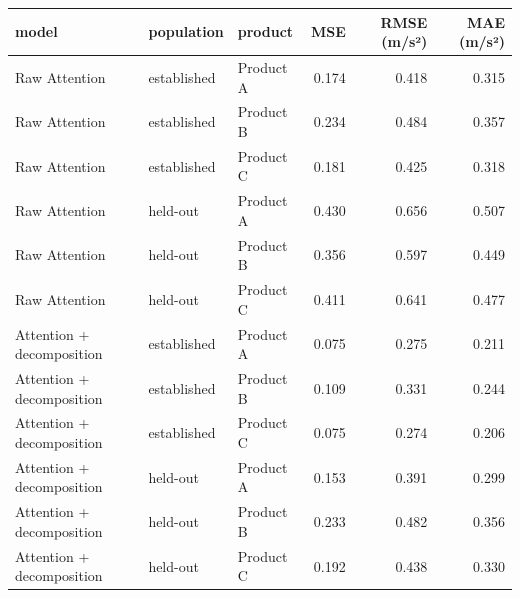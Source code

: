 \begin{tabular}{lllrrr}
\toprule
model & population & product & MSE & RMSE (m/s²) & MAE (m/s²) \\
\midrule
Raw Attention & established & Product A & 0.174 & 0.418 & 0.315 \\
Raw Attention & established & Product B & 0.234 & 0.484 & 0.357 \\
Raw Attention & established & Product C & 0.181 & 0.425 & 0.318 \\
Raw Attention & held-out & Product A & 0.430 & 0.656 & 0.507 \\
Raw Attention & held-out & Product B & 0.356 & 0.597 & 0.449 \\
Raw Attention & held-out & Product C & 0.411 & 0.641 & 0.477 \\
Attention + decomposition & established & Product A & 0.075 & 0.275 & 0.211 \\
Attention + decomposition & established & Product B & 0.109 & 0.331 & 0.244 \\
Attention + decomposition & established & Product C & 0.075 & 0.274 & 0.206 \\
Attention + decomposition & held-out & Product A & 0.153 & 0.391 & 0.299 \\
Attention + decomposition & held-out & Product B & 0.233 & 0.482 & 0.356 \\
Attention + decomposition & held-out & Product C & 0.192 & 0.438 & 0.330 \\
\bottomrule
\end{tabular}
